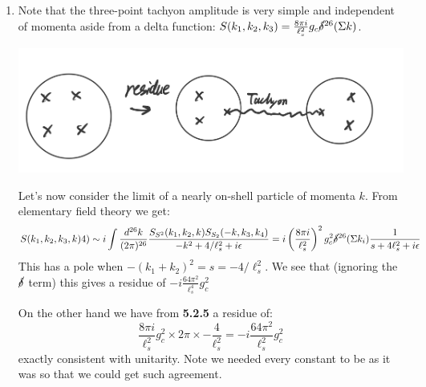 \documentclass[11pt, class=article, crop=false]{standalone}
\begin{document}
\begin{enumerate}
	\item 
	Note that the three-point tachyon amplitude is very simple and independent of momenta aside from a delta function: $S(k_1, k_2, k_3) = \frac{8 \pi i}{\ell_s^2} g_c \cancel\delta^{26}(\Sigma k)$. 
	
	\begin{center}
		\includegraphics[scale=0.1]{"Drawings/54"}
	\end{center}
	
	Let's now consider the limit of a nearly on-shell particle of momenta $k$. From elementary field theory we get:
	\[
		S(k_1, k_2, k_3, k)4) \sim i \int \frac{d^{26} k}{(2\pi)^{26}} \frac{S_{S^2} (k_1, k_2, k) S_{S_2} (-k, k_3, k_4)}{-k^2 + 4/\ell_s^2 + i \epsilon} = i \left(\frac{8 \pi i}{\ell_s^2}\right)^2 g_c^2 \cancel\delta^{26} (\Sigma k_i) \frac{1}{s + 4 \ell_s^2 + i \epsilon}
	\]
	This has a pole when $-(k_1 + k_2)^2 = s = -4/\ell_s^2$. We see that (ignoring the $\cancel\delta$ term) this gives a residue of $-i\frac{64 \pi^2}{\ell_s^4} g_c^2$
	
	On the other hand we have from \textbf{5.2.5} a residue of:
	\[
		\frac{8 \pi i}{\ell_s^2} g_c^2 \times 2\pi \times -\frac{4}{\ell_s^2} = - i \frac{64 \pi^2}{\ell_s^2} g_c^2
	\]
	exactly consistent with unitarity. Note we needed every constant to be as it was so that we could get such agreement. 
	

\end{enumerate}
\end{document}

